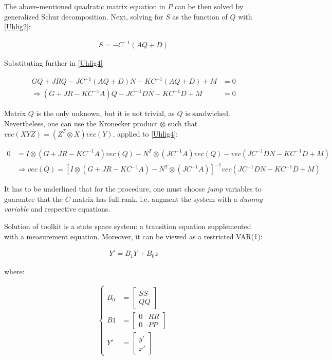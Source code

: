 \documentclass{pracamgr}
\numberwithin{equation}{section}
\begin{document}
The above-mentioned quadratic matrix equation in $P$ can be then solved by generalized Schur decomposition. Next, solving for $S$ as the function of $Q$ with \ref{Uhlig2}:

\begin{align}
S = -C^{-1} \left(AQ + D \right)
\end{align}

Substituting further in \ref{Uhlig4}

\begin{align}
GQ+JRQ-JC^{-1} (AQ+D)N - KC^{-1} (AQ+D)+M &= 0 \nonumber \\
\Rightarrow \left(G + JR - KC^{-1}A \right)Q - JC^{-1}DN - KC^{-1}D + M &= 0
\end{align}

Matrix $Q$ is the only unknown, but it is not trivial, as $Q$ is sandwiched. Nevertheless, one can use the Kronecker product $\otimes$ such that $vec \left(XYZ\right) = \left(Z^{T} \otimes X \right) vec(Y)$, applied to \ref{Uhlig4}:

\begin{align}
0 &= I \otimes \left(G + JR - KC^{-1}A \right) vec(Q) - N^{T} \otimes \left(JC^{-1}A\right) vec(Q) - vec\left(JC^{-1}DN - KC^{-1}D + M \right) \nonumber \\
& \Rightarrow vec(Q) = \left[ I \otimes \left(G + JR - KC^{-1}A \right) - N^{T} \otimes \left(JC^{-1}A \right)\right]^{-1} vec\left(JC^{-1}DN - KC^{-1}D + M \right)
\end{align}

It has to be underlined that for the \citet{uhlig1998toolkit} procedure, one must choose \textit{jump} variables to guarantee that the $C$ matrix has full rank, i.e. augment the system with a \textit{dummy variable} and respective equations.

Solution of \citet{uhlig1998toolkit} toolkit is a state space system: a transition equation supplemented with a measurement equation. Moreover, it can be viewed as a restricted VAR(1):

\begin{align}
Y' = B_{1}Y+ B_{0}z
\end{align}

where:

\begin{align}
\left\{
\begin{array}{cl}
B_{0} &= \begin{bmatrix}
    SS \\
    QQ
\end{bmatrix} \\
B1 &=  \begin{bmatrix}
    0 & RR \\
    0 & PP
\end{bmatrix} \\
Y' &= \begin{bmatrix}
    y' \\
    x'
\end{bmatrix}
\end{array}
\right.
\end{align}
\end{document}
